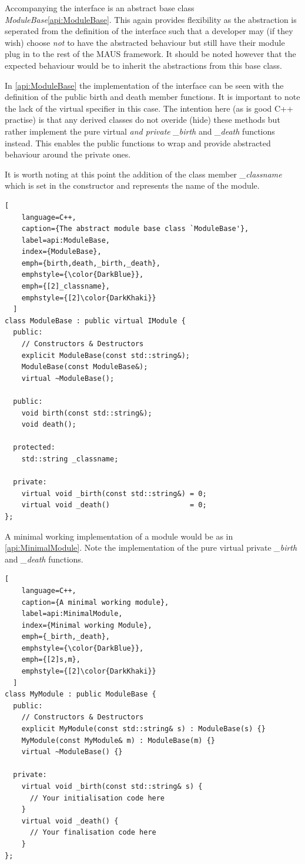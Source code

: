Accompanying the interface is an abstract base class \emph{ModuleBase}\ref{api:ModuleBase}. This again provides flexibility as the abstraction is seperated from the definition of the interface such that a developer may (if they wish) choose \emph{not} to have the abstracted behaviour but still have their module plug in to the rest of the MAUS framework. It should be noted however that the expected behaviour would be to inherit the abstractions from this base class.

In \ref{api:ModuleBase} the implementation of the interface can be seen with the definition of the public birth and death member functions. It is important to note the lack of the virtual specifier in this case. The intention here (as is good C++ practise) is that any derived classes do not overide (hide) these methods but rather implement the pure virtual \emph{and private} \emph{\_birth} and \emph{\_death} functions instead. This enables the public functions to wrap and provide abstracted behaviour around the private ones.

It is worth noting at this point the addition of the class member \emph{\_classname} which is set in the constructor and represents the name of the module. 

\begin{lstlisting}[
    language=C++,
    caption={The abstract module base class `ModuleBase'},
    label=api:ModuleBase,
    index={ModuleBase},
    emph={birth,death,_birth,_death},
    emphstyle={\color{DarkBlue}},
    emph={[2]_classname},
    emphstyle={[2]\color{DarkKhaki}}
  ]
class ModuleBase : public virtual IModule {
  public:
    // Constructors & Destructors
    explicit ModuleBase(const std::string&);
    ModuleBase(const ModuleBase&);
    virtual ~ModuleBase();

  public:
    void birth(const std::string&);
    void death();

  protected:
    std::string _classname;

  private:
    virtual void _birth(const std::string&) = 0;
    virtual void _death()                   = 0;
};
\end{lstlisting}


A minimal working implementation of a module would be as in \ref{api:MinimalModule}. Note the implementation of the pure virtual private \emph{\_birth} and \emph{\_death} functions.
\begin{lstlisting}[
    language=C++,
    caption={A minimal working module},
    label=api:MinimalModule,
    index={Minimal working Module},
    emph={_birth,_death},
    emphstyle={\color{DarkBlue}},
    emph={[2]s,m},
    emphstyle={[2]\color{DarkKhaki}}
  ]
class MyModule : public ModuleBase {
  public:
    // Constructors & Destructors
    explicit MyModule(const std::string& s) : ModuleBase(s) {}
    MyModule(const MyModule& m) : ModuleBase(m) {}
    virtual ~ModuleBase() {}

  private:
    virtual void _birth(const std::string& s) {
      // Your initialisation code here
    }
    virtual void _death() {
      // Your finalisation code here
    }
};
\end{lstlisting}

